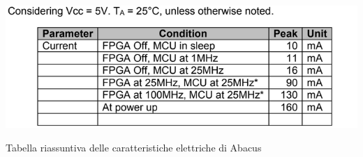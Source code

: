 \documentclass[LaM,binding=0.6cm]{../sapthesis}
\begin{document}
    \begin{table}[htbp]
    \centerline{\includegraphics[scale=.8]{examples/datasheet/abacusDatasheet6.PNG}}
    \caption{Tabella riassuntiva delle caratteristiche elettriche di Abacus}
    \label{fig}
    \end{table}




\backmatter

\clearpage

\cleardoublepage
{}

\end{document}
